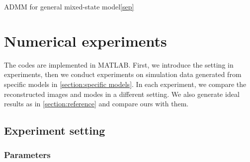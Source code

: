\documentclass{article}
\numberwithin{equation}{section}
\begin{document}
\begin{algorithm}
    \caption{ADMM for general mixed-state model\eqref{sep}}
    \label{alg:admm}
    
\end{algorithm}

\section{Numerical experiments}

The codes are implemented in MATLAB. First, we introduce the setting in experiments, then we conduct experiments on simulation data generated from specific models in \ref{section:specific models}. In each experiment, we compare the reconstructed images and modes in a different setting. We also generate ideal results as in \ref{section:reference} and compare ours with them. 
\subsection{Experiment setting}
\subsubsection{Parameters}
\end{document}
